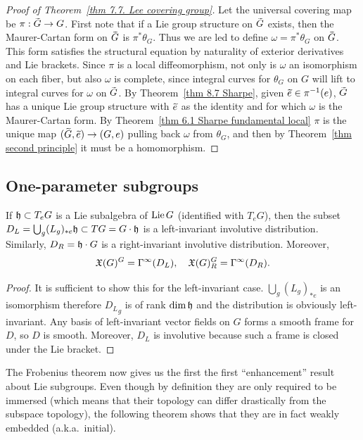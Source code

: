\begin{proof}[Proof of Theorem~\ref{thm 7.7. Lee covering group}]
    Let the universal covering map be $\pi:\wt{G}\to G$. First note that if a Lie group structure on $\wt{G}$ exists, then the Maurer-Cartan form on $\wt{G}$ is $\pi^\ast \theta_G$. Thus we are led to define $\omega=\pi^\ast\theta_G$ on $\wt{G}$. This form satisfies the structural equation by naturality of exterior derivatives and Lie brackets. Since $\pi$ is a local diffeomorphism, not only is $\omega$ an isomorphism on each fiber, but also $\omega$ is complete, since integral curves for $\theta_G$ on $G$ will lift to integral curves for $\omega$ on $\wt{G}$. By Theorem~\ref{thm 8.7 Sharpe}, given $\wt{e}\in \pi^{-1}(e)$, $\wt{G}$ has a unique Lie group structure with $\wt e$ as the identity and for which $\omega$ is the Maurer-Cartan form. By Theorem~\ref{thm 6.1 Sharpe fundamental local} $\pi$ is the unique map $(\wt{G},\wt{e})\to (G,e)$ pulling back $\omega$ from $\theta_G$, and then by Theorem~\ref{thm second principle} it must be a homomorphism.
\end{proof}





\subsection{One-parameter subgroups}


\begin{lem}\label{3972}
    If $\mathfrak{h}\subset T_e G$ is a Lie subalgebra of $\operatorname{Lie} G$ (identified with $T_eG$), then the subset $D_L=\bigcup_g (L_g)_{\ast e}\mathfrak{h}\subset TG=G\cdot \mathfrak{h}$ is a left-invariant involutive distribution. Similarly, $D_R=\mathfrak{h}\cdot G$ is a right-invariant involutive distribution. Moreover,
    \[\mathfrak{X}(G)^G=\Gamma^\infty(D_L),\quad \mathfrak{X}(G)^G_R=\Gamma^\infty(D_R).\]
\end{lem}
\begin{proof}
    It is sufficient to show this for the left-invariant case.
    $\bigcup_g (L_g)_{\ast e}$ is an isomorphism therefore ${D_L}_g$ is of rank $\dim \mathfrak{h}$ and the distribution is obviously left-invariant. Any basis of left-invariant vector fields on $G$ forms a smooth frame for $D$, so $D$ is smooth. Moreover, $D_L$ is involutive because such a frame is closed under the Lie bracket.
\end{proof}

The Frobenius theorem now gives us the first the first ``enhancement'' result about Lie subgroups. Even though by definition they are only required to be immersed (which means that their topology can differ drastically from the subspace topology), the following theorem shows that they are in fact weakly embedded (a.k.a.~initial).

